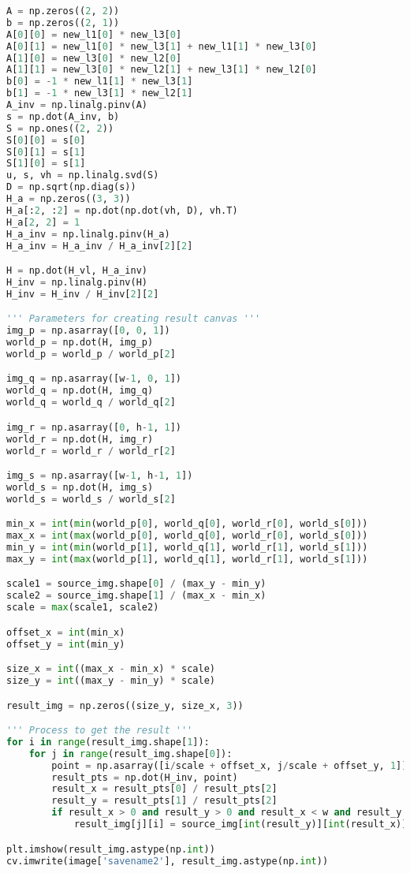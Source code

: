 \documentclass[11pt]{article}
\begin{document}
\begin{lstlisting}[language=Python, showstringspaces=false]
A = np.zeros((2, 2))
b = np.zeros((2, 1))
A[0][0] = new_l1[0] * new_l3[0]
A[0][1] = new_l1[0] * new_l3[1] + new_l1[1] * new_l3[0]
A[1][0] = new_l3[0] * new_l2[0]
A[1][1] = new_l3[0] * new_l2[1] + new_l3[1] * new_l2[0]
b[0] = -1 * new_l1[1] * new_l3[1]
b[1] = -1 * new_l3[1] * new_l2[1]
A_inv = np.linalg.pinv(A)
s = np.dot(A_inv, b)
S = np.ones((2, 2))
S[0][0] = s[0]
S[0][1] = s[1]
S[1][0] = s[1]
u, s, vh = np.linalg.svd(S)
D = np.sqrt(np.diag(s))
H_a = np.zeros((3, 3))
H_a[:2, :2] = np.dot(np.dot(vh, D), vh.T)
H_a[2, 2] = 1
H_a_inv = np.linalg.pinv(H_a)
H_a_inv = H_a_inv / H_a_inv[2][2]

H = np.dot(H_vl, H_a_inv)
H_inv = np.linalg.pinv(H)
H_inv = H_inv / H_inv[2][2]

''' Parameters for creating result canvas '''
img_p = np.asarray([0, 0, 1])
world_p = np.dot(H, img_p)
world_p = world_p / world_p[2]

img_q = np.asarray([w-1, 0, 1])
world_q = np.dot(H, img_q)
world_q = world_q / world_q[2]

img_r = np.asarray([0, h-1, 1])
world_r = np.dot(H, img_r)
world_r = world_r / world_r[2]

img_s = np.asarray([w-1, h-1, 1])
world_s = np.dot(H, img_s)
world_s = world_s / world_s[2]

min_x = int(min(world_p[0], world_q[0], world_r[0], world_s[0]))
max_x = int(max(world_p[0], world_q[0], world_r[0], world_s[0]))
min_y = int(min(world_p[1], world_q[1], world_r[1], world_s[1]))
max_y = int(max(world_p[1], world_q[1], world_r[1], world_s[1]))

scale1 = source_img.shape[0] / (max_y - min_y)
scale2 = source_img.shape[1] / (max_x - min_x)
scale = max(scale1, scale2)

offset_x = int(min_x) 
offset_y = int(min_y) 

size_x = int((max_x - min_x) * scale)
size_y = int((max_y - min_y) * scale)

result_img = np.zeros((size_y, size_x, 3))

''' Process to get the result '''
for i in range(result_img.shape[1]):
    for j in range(result_img.shape[0]):
        point = np.asarray([i/scale + offset_x, j/scale + offset_y, 1])
        result_pts = np.dot(H_inv, point)
        result_x = result_pts[0] / result_pts[2]
        result_y = result_pts[1] / result_pts[2]
        if result_x > 0 and result_y > 0 and result_x < w and result_y < h:
            result_img[j][i] = source_img[int(result_y)][int(result_x)]

plt.imshow(result_img.astype(np.int))
cv.imwrite(image['savename2'], result_img.astype(np.int))
\end{lstlisting}
\end{document}
